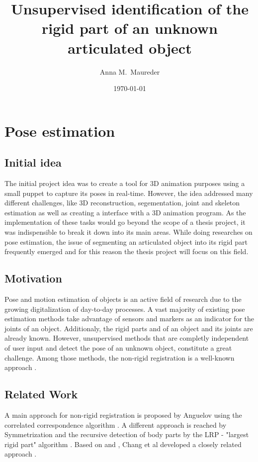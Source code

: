 \documentclass[a4paper,english,11pt]{report}
\author{Anna M.\ Maureder}
\title{Unsupervised identification of the rigid part of an unknown articulated object}
\date{\today}
\begin{document}
\maketitle
\tableofcontents

\chapter {Pose estimation}

\section{Initial idea}

The initial project idea was to create a tool for 3D animation purposes using a small puppet to capture its poses in real-time. However, the idea addressed many different challenges, like 3D reconstruction, segementation, joint and skeleton estimation as well as creating a interface with a 3D animation program. As the implementation of these tasks would go beyond the scope of a thesis project, it was indispensible to break it down into its main areas. While doing researches on pose estimation, the issue of segmenting an articulated object into its rigid part frequently emerged and for this reason the thesis project will focus on this field.

\section{Motivation}

Pose and motion estimation of objects is an active field of research due to the growing digitalization of day-to-day processes. A vast majority of existing pose estimation methods take advantage of sensors and markers as an indicator for the joints of an object. Additionaly, the rigid parts and of an object and its joints are already known. However, unsupervised methods that are completly independent of user input and detect the pose of an unknown object, constitute a great challenge. Among those methods, the non-rigid registration is a well-known approach \cite{survey}.

\section{Related Work}
\label{cha:relatedWork}

A main approach for non-rigid registration is proposed by Anguelov \cite{Anguelov04} using the correlated correspondence algorithm \cite{CorrelatedCorrespondance}. A different approach is reached by Symmetrization \cite{Mitra07} and the recursive detection of body parts by the LRP - "largest rigid part" algorithm \cite {correspondence}. Based on \cite{Anguelov04} and \cite{Mitra07}, Chang et al developed a closely related approach \cite{chang08articulated} \cite{chang09range}.
\end{document}
